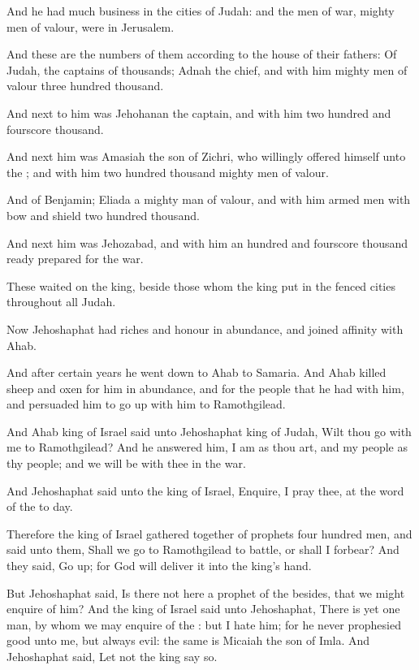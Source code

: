 \Verse And he had much business in the cities of Judah: and the men of war, mighty men of valour, were in Jerusalem.

\Verse And these are the numbers of them according to the house of their fathers: Of Judah, the captains of thousands; Adnah the chief, and with him mighty men of valour three hundred thousand.

\Verse And next to him was Jehohanan the captain, and with him two hundred and fourscore thousand.

\Verse And next him was Amasiah the son of Zichri, who willingly offered himself unto the \LORD; and with him two hundred thousand mighty men of valour.

\Verse And of Benjamin; Eliada a mighty man of valour, and with him armed men with bow and shield two hundred thousand.

\Verse And next him was Jehozabad, and with him an hundred and fourscore thousand ready prepared for the war.

\Verse These waited on the king, beside those whom the king put in the fenced cities throughout all Judah.


\Chapter
\Verse Now Jehoshaphat had riches and honour in abundance, and joined affinity with Ahab.

\Verse And after certain years he went down to Ahab to Samaria. And Ahab killed sheep and oxen for him in abundance, and for the people that he had with him, and persuaded him to go up with him to Ramothgilead.

\Verse And Ahab king of Israel said unto Jehoshaphat king of Judah, Wilt thou go with me to Ramothgilead? And he answered him, I am as thou art, and my people as thy people; and we will be with thee in the war.

\Verse And Jehoshaphat said unto the king of Israel, Enquire, I pray thee, at the word of the \LORD to day.

\Verse Therefore the king of Israel gathered together of prophets four hundred men, and said unto them, Shall we go to Ramothgilead to battle, or shall I forbear? And they said, Go up; for God will deliver it into the king's hand.

\Verse But Jehoshaphat said, Is there not here a prophet of the \LORD besides, that we might enquire of him?  \Verse And the king of Israel said unto Jehoshaphat, There is yet one man, by whom we may enquire of the \LORD: but I hate him; for he never prophesied good unto me, but always evil: the same is Micaiah the son of Imla. And Jehoshaphat said, Let not the king say so.

